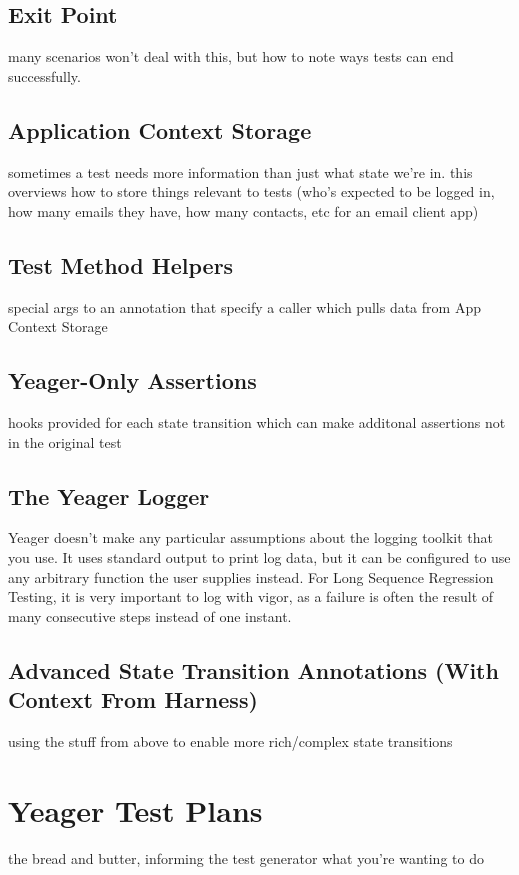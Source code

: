 \subsection{Exit Point}
many scenarios won't deal with this, but how to note ways tests can end successfully. %

\subsection{Application Context Storage}
sometimes a test needs more information than just what state we're in. this overviews how to store things relevant to tests (who's expected to be logged in, how many emails they have, how many contacts, etc for an email client app) %

\subsection{Test Method Helpers}
special args to an annotation that specify a caller which pulls data from App Context Storage %

\subsection{Yeager-Only Assertions}
hooks provided for each state transition which can make additonal assertions not in the original test %

\subsection{The Yeager Logger}
Yeager doesn't make any particular assumptions about the logging toolkit that you use. It uses standard output to print log data, but it can be configured to use any arbitrary function the user supplies instead. For Long Sequence Regression Testing, it is very important to log with vigor, as a failure is often the result of many consecutive steps instead of one instant. %

\subsection{Advanced State Transition Annotations (With Context From Harness)}
using the stuff from above to enable more rich/complex state transitions %

\section{Yeager Test Plans}
the bread and butter, informing the test generator what you're wanting to do %

